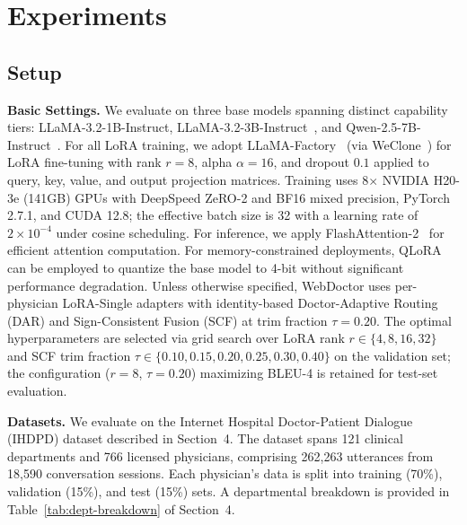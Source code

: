 
\section{Experiments}\label{section:evaluation}

\subsection{Setup}


\textbf{Basic Settings.} We evaluate on three base models spanning distinct capability tiers: LLaMA-3.2-1B-Instruct, LLaMA-3.2-3B-Instruct~\cite{grattafioriLlama3Herd2024}, and Qwen-2.5-7B-Instruct~\cite{qwenQwen25TechnicalReport2025}. For all LoRA training, we adopt LLaMA-Factory~\cite{zheng2024llamafactory} (via WeClone~\cite{xmingXming521WeClone2026}) for LoRA fine-tuning with rank $r=8$, alpha $\alpha=16$, and dropout $0.1$ applied to query, key, value, and output projection matrices. Training uses 8$\times$ NVIDIA H20-3e (141GB) GPUs with DeepSpeed ZeRO-2 and BF16 mixed precision, PyTorch 2.7.1, and CUDA 12.8; the effective batch size is 32 with a learning rate of $2\times10^{-4}$ under cosine scheduling. For inference, we apply FlashAttention-2~\cite{dao2023flashattention} for efficient attention computation. For memory-constrained deployments, QLoRA~\cite{dettmers2023qlora} can be employed to quantize the base model to 4-bit without significant performance degradation. Unless otherwise specified, WebDoctor uses per-physician LoRA-Single adapters with identity-based Doctor-Adaptive Routing (DAR) and Sign-Consistent Fusion (SCF) at trim fraction $\tau=0.20$. The optimal hyperparameters are selected via grid search over LoRA rank $r \in \{4,8,16,32\}$ and SCF trim fraction $\tau \in \{0.10,0.15,0.20,0.25,0.30,0.40\}$ on the validation set; the configuration ($r=8$, $\tau=0.20$) maximizing BLEU-4 is retained for test-set evaluation. 

\textbf{Datasets.} We evaluate on the Internet Hospital Doctor-Patient Dialogue (IHDPD) dataset described in Section~4. The dataset spans 121 clinical departments and 766 licensed physicians, comprising 262,263 utterances from 18,590 conversation sessions. Each physician's data is split into training (70\%), validation (15\%), and test (15\%) sets. A departmental breakdown is provided in Table~\ref{tab:dept-breakdown} of Section~4.

